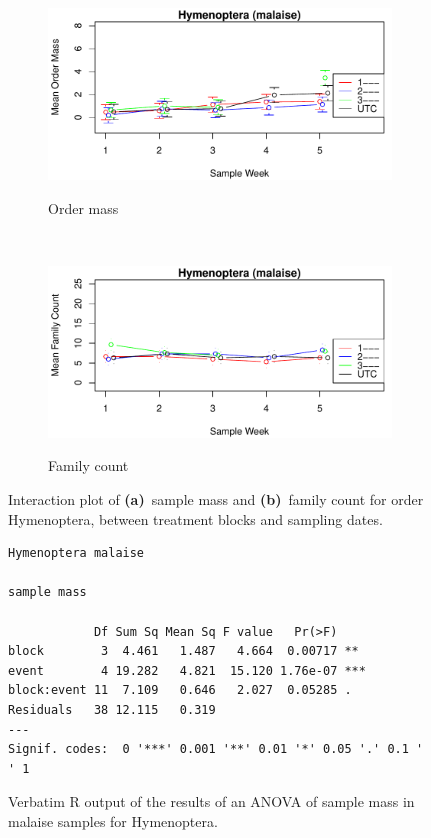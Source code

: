 \documentclass[10pt,letterpaper,twocolumn]{article}
\begin{document}
\begin{figure}[h]
	\centering
	\begin{subfigure}[b]{0.45\textwidth}
		\caption{Order mass}
		\includegraphics[width=\textwidth]{plots/blocks/interaction/mass/mass_malaise_Hymenoptera_interplot.pdf}
		\label{fig:malaise_hymenoptera_mass_interplot}
	\end{subfigure}
	~
	\begin{subfigure}[b]{0.45\textwidth}
		\caption{Family count}
		\includegraphics[width=\textwidth]{plots/blocks/interaction/family/family_malaise_Hymenoptera_interplot.pdf}
		\label{fig:malaise_hymenoptera_family_interplot}
	\end{subfigure}
	\caption{Interaction plot of \textbf{(a)}~sample mass and \textbf{(b)}~family count for order Hymenoptera, between treatment blocks and sampling dates.}
	\label{fig:malaise_hymenoptera_interplot}
	\smallskip
	\nointerlineskip
	\hrulefill
\end{figure}

\begin{figure}[h]
	\lstset{numbers=left}
	\lstset{xleftmargin=5mm,framexleftmargin=5mm}
	\begin{lstlisting}
Hymenoptera malaise 

sample mass 

            Df Sum Sq Mean Sq F value   Pr(>F)    
block        3  4.461   1.487   4.664  0.00717 ** 
event        4 19.282   4.821  15.120 1.76e-07 ***
block:event 11  7.109   0.646   2.027  0.05285 .  
Residuals   38 12.115   0.319                     
---
Signif. codes:  0 '***' 0.001 '**' 0.01 '*' 0.05 '.' 0.1 ' ' 1
	\end{lstlisting}
	\caption{Verbatim R output of the results of an ANOVA of sample mass in malaise samples for Hymenoptera.}
	\label{fig:malaise_hymenoptera_mass_anova}
	\smallskip
	\nointerlineskip
	\hrulefill
\end{figure}
\end{document}
